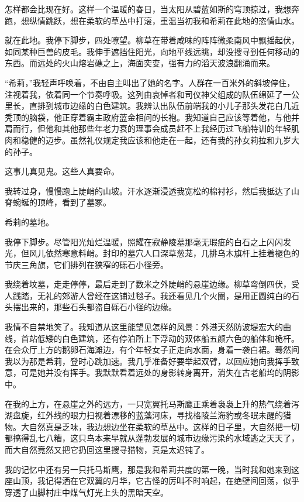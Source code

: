 \documentclass[AutoFakeBold=true]{book}
\begin{document}
怎样都会比现在好。这样一个温暖的春日，当太阳从碧蓝如斯的穹顶掠过，我想奔跑，想纵情跳跃，想在柔软的草丛中打滚，重温当初我和希莉在此地的恣情山水。

就在此地。我停下脚步，四处嘹望。柳草在带着咸味的阵阵微柔南风中飘摇起伏，如同某种巨兽的皮毛。我伸手遮挡住阳光，向地平线远眺，却没搜寻到任何移动的东西。而远处的火山熔岩礁之上，海面突变，强有力的滔天波浪翻涌而来。

``希莉，''我轻声呼唤着，不由自主叫出了她的名字。人群在一百米外的斜坡停住，注视着我，依着同一个节奏呼吸。这列由哀悼者和司仪神父组成的队伍绵延了一公里长，直排到城市边缘的白色建筑。我辨认出队伍前端我的小儿子那头发花白几近秃顶的脑袋，他正穿着霸主政府蓝金相问的长袍。我知道自己应该等着他，与他并肩而行，但他和其他那些年老力衰的理事会成员赶不上我经历过飞船特训的年轻肌肉和稳健的迈步。虽然礼仪规定我应该和他走在一起，还有我的孙女莉拉和九岁大的孙子。

这事儿真见鬼。这些人真要命。

我转过身，慢慢跑上陡峭的山坡。汗水逐渐浸透我宽松的棉衬衫，然后我抵达了山脊蜿蜒的顶峰，看到了墓冢。

{\kaishu 希莉的墓地。}

我停下脚步。尽管阳光灿烂温暖，照耀在寂静陵墓那毫无瑕疵的白石之上闪闪发光，但风儿依然寒意料峭。封印的墓穴人口深草葱茏，几排乌木旗杆上挂着褪色的节庆三角旗，它们排列在狭窄的砾石小径旁。

我绕着坟墓，走走停停，最后走到了数米之外陡峭的悬崖边缘。柳草弯倒四伏，受人践踏，无礼的郊游人曾经在这铺过毯子。我还看见几个火圈，是用正圆纯白的石头摆出来的，那些石头都盗自砾石小径的边缘。

我情不自禁地笑了。我知道从这里能望见怎样的风景：外港天然防波堤宏大的曲线，首站低矮的白色建筑，还有停泊所上下浮动的双体船五颜六色的船体和桅杆。在会众厅上方的鹅卵石海滩边，有个年轻女子正走向水面，身着一袭白裙。蓦然间我以为那是希莉，登时心跳加速。我几乎准备好要举起双臂，以回应她向我挥手致意，可是她并没有挥手。我默默看着远处的身影转身离开，消失在古老船坞的阴影中。

在我的上方，在悬崖之外的远方，一只宽翼托马斯鹰正乘着袅袅上升的热气绕着泻湖盘旋，红外线的眼力扫视着漂移的蓝藻河床，寻找格陵兰海豹或冬眠未醒的猎物。大自然真是乏味，我边想边坐在柔软的草丛中。这样的日子里，大自然把一切都搞得乱七八糟，这只鸟本来早就从蓬勃发展的城市边缘污染的水域逃之天天了，而大自然竟然又把它扔回这里搜寻猎物，真是太迟钝了。

我的记忆中还有另一只托马斯鹰，那是我和希莉共度的第一晚，当时我和她来到这座山顶，我记得洒在它双翼的月华，它古怪的厉叫不时响起，在绝壁间回荡，似乎穿透了山脚村庄中煤气灯光上头的黑暗天空。
\end{document}
